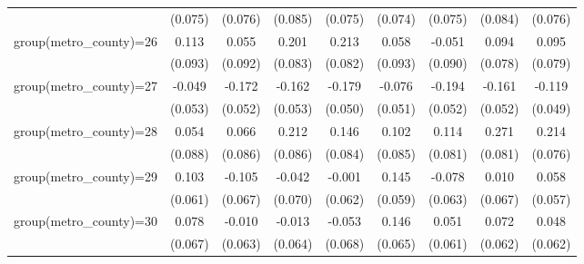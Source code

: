 {\begin{tabular}{l*{8}{c}}
                    &     (0.075)         &     (0.076)         &     (0.085)         &     (0.075)         &     (0.074)         &     (0.075)         &     (0.084)         &     (0.076)         \\
group(metro\_county)=26&       0.113         &       0.055         &       0.201\sym{**} &       0.213\sym{**} &       0.058         &      -0.051         &       0.094         &       0.095         \\
                    &     (0.093)         &     (0.092)         &     (0.083)         &     (0.082)         &     (0.093)         &     (0.090)         &     (0.078)         &     (0.079)         \\
group(metro\_county)=27&      -0.049         &      -0.172\sym{***}&      -0.162\sym{***}&      -0.179\sym{***}&      -0.076         &      -0.194\sym{***}&      -0.161\sym{***}&      -0.119\sym{**} \\
                    &     (0.053)         &     (0.052)         &     (0.053)         &     (0.050)         &     (0.051)         &     (0.052)         &     (0.052)         &     (0.049)         \\
group(metro\_county)=28&       0.054         &       0.066         &       0.212\sym{**} &       0.146\sym{*}  &       0.102         &       0.114         &       0.271\sym{***}&       0.214\sym{***}\\
                    &     (0.088)         &     (0.086)         &     (0.086)         &     (0.084)         &     (0.085)         &     (0.081)         &     (0.081)         &     (0.076)         \\
group(metro\_county)=29&       0.103\sym{*}  &      -0.105         &      -0.042         &      -0.001         &       0.145\sym{**} &      -0.078         &       0.010         &       0.058         \\
                    &     (0.061)         &     (0.067)         &     (0.070)         &     (0.062)         &     (0.059)         &     (0.063)         &     (0.067)         &     (0.057)         \\
group(metro\_county)=30&       0.078         &      -0.010         &      -0.013         &      -0.053         &       0.146\sym{**} &       0.051         &       0.072         &       0.048         \\
                    &     (0.067)         &     (0.063)         &     (0.064)         &     (0.068)         &     (0.065)         &     (0.061)         &     (0.062)         &     (0.062)         \\

\end{tabular}}
